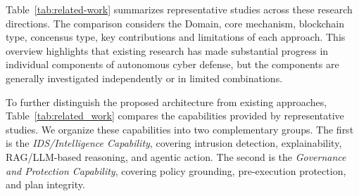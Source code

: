 \documentclass[10pt, conference]{IEEEtran}
\begin{document}
Table~\ref{tab:related-work} summarizes representative studies across
these research directions. The comparison considers the Domain, core mechanism,
blockchain type, concensus type, key contributions and limitations of each
approach. This overview highlights that existing research has made
substantial progress in individual components of autonomous cyber defense,
but the components are generally investigated independently or in limited
combinations.


To further distinguish the proposed architecture from existing approaches,
Table~\ref{tab:related_work} compares the capabilities provided by
representative studies. We organize these capabilities into two
complementary groups. The first is the \textit{IDS/Intelligence Capability}, covering intrusion detection, explainability, RAG/LLM-based reasoning, and agentic action. The second is the \textit{Governance and Protection Capability}, covering policy grounding, pre-execution protection, and plan integrity.

\end{document}
